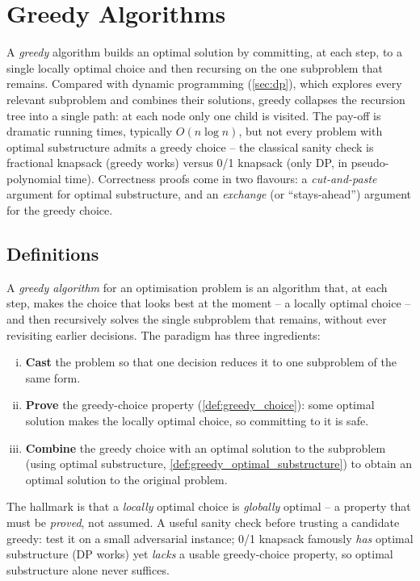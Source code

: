 \section{Greedy Algorithms}
\label{sec:greedy}

A \emph{greedy} algorithm builds an optimal solution by committing, at each step, to a single locally optimal choice and then recursing on the one subproblem that remains. Compared with dynamic programming (\cref{sec:dp}), which explores every relevant subproblem and combines their solutions, greedy collapses the recursion tree into a single path: at each node only one child is visited. The pay-off is dramatic running times, typically $O(n \log n)$, but not every problem with optimal substructure admits a greedy choice -- the classical sanity check is fractional knapsack (greedy works) versus 0/1 knapsack (only DP, in pseudo-polynomial time). Correctness proofs come in two flavours: a \emph{cut-and-paste} argument for optimal substructure, and an \emph{exchange} (or ``stays-ahead'') argument for the greedy choice.

\subsection{Definitions}

\begin{definition}
\label{def:greedy_algorithm}
A \emph{greedy algorithm} for an optimisation problem is an algorithm that, at each step, makes the choice that looks best at the moment -- a locally optimal choice -- and then recursively solves the single subproblem that remains, without ever revisiting earlier decisions. The paradigm has three ingredients:
\begin{enumerate}[(i)]
  \item \textbf{Cast} the problem so that one decision reduces it to one subproblem of the same form.
  \item \textbf{Prove} the greedy-choice property (\cref{def:greedy_choice}): some optimal solution makes the locally optimal choice, so committing to it is safe.
  \item \textbf{Combine} the greedy choice with an optimal solution to the subproblem (using optimal substructure, \cref{def:greedy_optimal_substructure}) to obtain an optimal solution to the original problem.
\end{enumerate}
The hallmark is that a \emph{locally} optimal choice is \emph{globally} optimal -- a property that must be \emph{proved}, not assumed. A useful sanity check before trusting a candidate greedy: test it on a small adversarial instance; 0/1 knapsack famously \emph{has} optimal substructure (DP works) yet \emph{lacks} a usable greedy-choice property, so optimal substructure alone never suffices.
\end{definition}

